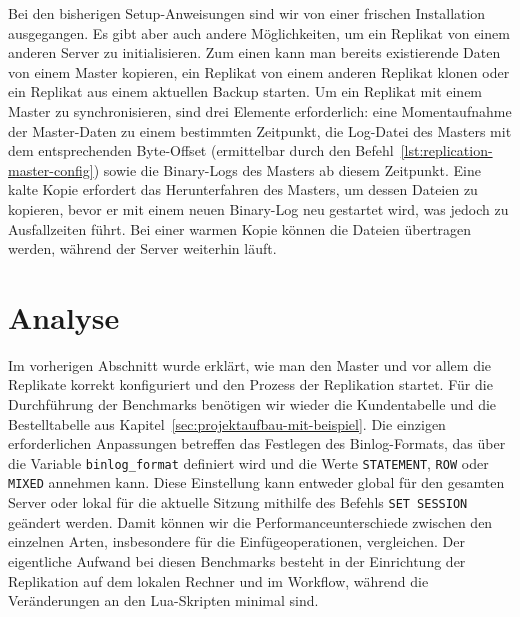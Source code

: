 Bei den bisherigen Setup-Anweisungen sind wir von einer frischen Installation ausgegangen.
Es gibt aber auch andere Möglichkeiten, um ein Replikat von einem anderen Server zu initialisieren.
Zum einen kann man bereits existierende Daten von einem Master kopieren, ein Replikat von einem anderen Replikat klonen oder ein Replikat aus einem aktuellen Backup starten.
Um ein Replikat mit einem Master zu synchronisieren, sind drei Elemente erforderlich: eine Momentaufnahme der Master-Daten zu einem bestimmten Zeitpunkt, die Log-Datei des Masters mit dem entsprechenden Byte-Offset (ermittelbar durch den Befehl~\ref{lst:replication-master-config}) sowie die Binary-Logs des Masters ab diesem Zeitpunkt.
Eine kalte Kopie erfordert das Herunterfahren des Masters, um dessen Dateien zu kopieren, bevor er mit einem neuen Binary-Log neu gestartet wird, was jedoch zu Ausfallzeiten führt.
Bei einer warmen Kopie können die Dateien übertragen werden, während der Server weiterhin läuft.

\section{Analyse}\label{sec:replication-analyse}

Im vorherigen Abschnitt wurde erklärt, wie man den Master und vor allem die Replikate korrekt konfiguriert und den Prozess der Replikation startet.
Für die Durchführung der Benchmarks benötigen wir wieder die Kundentabelle und die Bestelltabelle aus Kapitel~\ref{sec:projektaufbau-mit-beispiel}.
Die einzigen erforderlichen Anpassungen betreffen das Festlegen des Binlog-Formats, das über die Variable \texttt{binlog\_format} definiert wird und die Werte \texttt{STATEMENT}, \texttt{ROW} oder \texttt{MIXED} annehmen kann.
Diese Einstellung kann entweder global für den gesamten Server oder lokal für die aktuelle Sitzung mithilfe des Befehls \texttt{SET SESSION} geändert werden.
Damit können wir die Performanceunterschiede zwischen den einzelnen Arten, insbesondere für die Einfügeoperationen, vergleichen.
Der eigentliche Aufwand bei diesen Benchmarks besteht in der Einrichtung der Replikation auf dem lokalen Rechner und im Workflow, während die Veränderungen an den Lua-Skripten minimal sind.

